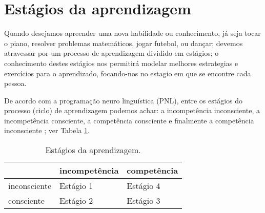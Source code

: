 \section{Estágios da aprendizagem}
\label{sec:aprendizagem}
Quando desejamos apreender uma nova habilidade ou conhecimento, já seja tocar o piano,
resolver problemas matemáticos,
jogar futebol, ou dançar; devemos atravessar por um processo de aprendizagem dividido em estágios;
o conhecimento destes estágios nos permitirá modelar melhores estrategias e exercícios para o aprendizado,
focando-nos no estagio em que se encontre cada pessoa.

De acordo com a programação neuro linguística (PNL), 
entre os estágios do processo (ciclo) de aprendizagem podemos achar:
a incompetência inconsciente, a incompetência consciente, 
a competência consciente e finalmente a competência inconsciente 
\cite[pp. 249]{seymourtreinando} \cite[pp. 10]{passadori7} \cite{de2013treinamentos};
ver Tabela \ref{tab:learning1}.

\begin{table}[!h]
  \centering
  \begin{tabular}{|l||l|l|}
   \hline
    ~             & incompetência & competência \\ \hline \hline
    inconsciente  & Estágio 1     & Estágio 4   \\ \hline
    consciente    & Estágio 2     & Estágio 3   \\ \hline
  \end{tabular}
  \caption{Estágios da aprendizagem.}
  \label{tab:learning1}
\end{table}

